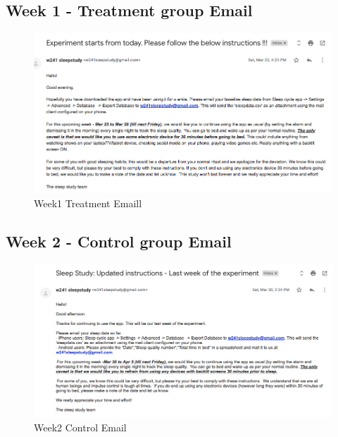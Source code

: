 \documentclass[12pt,]{article}
\begin{document}
\subsection{Week 1 - Treatment group
Email}\label{week-1---treatment-group-email}

\begin{figure}[H]

{\centering \includegraphics[width=1\linewidth]{img/week1_treatment} 

}

\caption{Week1 Treatment Emaill}\label{fig:unnamed-chunk-10}
\end{figure}

\subsection{Week 2 - Control group
Email}\label{week-2---control-group-email}

\begin{figure}[H]

{\centering \includegraphics[width=1\linewidth]{img/week2_control} 

}

\caption{Week2 Control Email}\label{fig:unnamed-chunk-11}
\end{figure}
\end{document}
